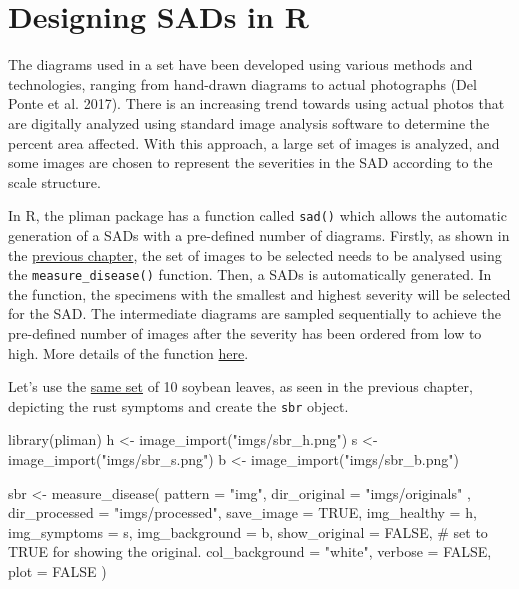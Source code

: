 \documentclass[
  letterpaper,
]{book}
\newenvironment{Shaded}{\begin{snugshade}}{\end{snugshade}}
\newcommand{\AttributeTok}[1]{\textcolor[rgb]{0.40,0.45,0.13}{#1}}
\newcommand{\CommentTok}[1]{\textcolor[rgb]{0.37,0.37,0.37}{#1}}
\newcommand{\ConstantTok}[1]{\textcolor[rgb]{0.56,0.35,0.01}{#1}}
\newcommand{\FunctionTok}[1]{\textcolor[rgb]{0.28,0.35,0.67}{#1}}
\newcommand{\NormalTok}[1]{\textcolor[rgb]{0.00,0.23,0.31}{#1}}
\newcommand{\OtherTok}[1]{\textcolor[rgb]{0.00,0.23,0.31}{#1}}
\newcommand{\StringTok}[1]{\textcolor[rgb]{0.13,0.47,0.30}{#1}}
\begin{document}
\hypertarget{designing-sads-in-r}{%
\section{Designing SADs in R}\label{designing-sads-in-r}}

The diagrams used in a set have been developed using various methods and
technologies, ranging from hand-drawn diagrams to actual photographs
(Del Ponte et al. 2017). There is an increasing trend towards using
actual photos that are digitally analyzed using standard image analysis
software to determine the percent area affected. With this approach, a
large set of images is analyzed, and some images are chosen to represent
the severities in the SAD according to the scale structure.

In R, the pliman package has a function called \texttt{sad()} which
allows the automatic generation of a SADs with a pre-defined number of
diagrams. Firstly, as shown in the
\href{data-actual-severity.html}{previous chapter}, the set of images to
be selected needs to be analysed using the \texttt{measure\_disease()}
function. Then, a SADs is automatically generated. In the function, the
specimens with the smallest and highest severity will be selected for
the SAD. The intermediate diagrams are sampled sequentially to achieve
the pre-defined number of images after the severity has been ordered
from low to high. More details of the function
\href{https://tiagoolivoto.github.io/pliman/reference/sad.html}{here}.

Let's use the \protect\hyperlink{multiple-images}{same set} of 10
soybean leaves, as seen in the previous chapter, depicting the rust
symptoms and create the \texttt{sbr} object.

\begin{Shaded}
\begin{Highlighting}[]
\FunctionTok{library}\NormalTok{(pliman)}
\NormalTok{h }\OtherTok{\textless{}{-}} \FunctionTok{image\_import}\NormalTok{(}\StringTok{"imgs/sbr\_h.png"}\NormalTok{)}
\NormalTok{s }\OtherTok{\textless{}{-}} \FunctionTok{image\_import}\NormalTok{(}\StringTok{"imgs/sbr\_s.png"}\NormalTok{)}
\NormalTok{b }\OtherTok{\textless{}{-}} \FunctionTok{image\_import}\NormalTok{(}\StringTok{"imgs/sbr\_b.png"}\NormalTok{)}

\NormalTok{sbr }\OtherTok{\textless{}{-}} \FunctionTok{measure\_disease}\NormalTok{(}
  \AttributeTok{pattern =} \StringTok{"img"}\NormalTok{,}
  \AttributeTok{dir\_original =} \StringTok{"imgs/originals"}\NormalTok{ ,}
  \AttributeTok{dir\_processed =} \StringTok{"imgs/processed"}\NormalTok{,}
  \AttributeTok{save\_image =} \ConstantTok{TRUE}\NormalTok{,}
  \AttributeTok{img\_healthy =}\NormalTok{ h,}
  \AttributeTok{img\_symptoms =}\NormalTok{ s,}
  \AttributeTok{img\_background =}\NormalTok{ b,}
  \AttributeTok{show\_original =} \ConstantTok{FALSE}\NormalTok{, }\CommentTok{\# set to TRUE for showing the original.}
  \AttributeTok{col\_background =} \StringTok{"white"}\NormalTok{, }
  \AttributeTok{verbose =} \ConstantTok{FALSE}\NormalTok{,}
  \AttributeTok{plot =} \ConstantTok{FALSE}
\NormalTok{)}
\end{Highlighting}
\end{Shaded}
\end{document}
